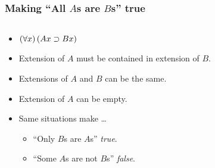 \begin{frame}
\frametitle{Making ``All $A$s are $B$s'' true}

\begin{columns}
  \begin{column}{.5\textwidth}
    \begin{itemize}
      \item $(\forall x)\,(Ax \supset Bx)$
      \item Extension of $A$ must be contained in extension of $B$.
      \item Extensions of $A$ and $B$ can be the same.
      \item Extension of $A$ can be empty.
      \item Same situations make \dots
      \begin{itemize}
        \item ``Only $B$s are $A$s'' \emph{true}.
        \item ``Some $A$s are not $B$s'' \emph{false}.
      \end{itemize}
    \end{itemize}
  \end{column}
  \begin{column}{.5\textwidth}
\end{column}
\end{columns}
\end{frame}

